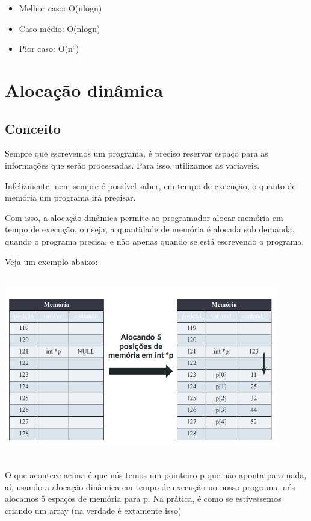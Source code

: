 \documentclass{report}
\begin{document}
	\begin{itemize}
		\item Melhor caso: O(nlogn)
		\item Caso médio: O(nlogn)
		\item Pior caso: O(n²)
	\end{itemize} 
	
	\chapter{Alocação dinâmica}
	
	\section{Conceito}
	
	Sempre que escrevemos um programa, é preciso reservar espaço para as informações que serão processadas. Para isso, utilizamos as variaveis.
	
	Infelizmente, nem sempre é possível saber, em tempo de execução, o quanto de memória um
	programa irá precisar. 
	
	Com isso, a alocação dinâmica permite ao programador alocar memória em tempo de execução, ou seja, a quantidade de memória é alocada sob demanda, quando o programa
	precisa, e não apenas quando se
	está escrevendo o programa.
	
	Veja um exemplo abaixo:
	
	\begin{center}
		
		\includegraphics[width=12cm,height=8cm,keepaspectratio=false]{imagens/dynamicaloc.png}
		
	\end{center}
	
	O que acontece acima é que nós temos um pointeiro p que não aponta para nada, aí, usando a alocação dinâmica em tempo de execução no nosso programa, nós alocamos 5 espaços de memória para p. Na prática, é como se estivessemos criando um array (na verdade é extamente isso)
	
\end{document}
